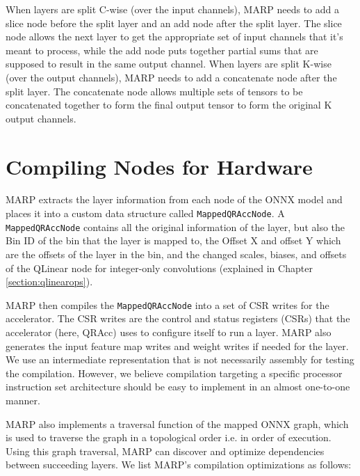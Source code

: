 When layers are split C-wise (over the input channels), MARP needs to add a slice node before the split layer and an add node after the split layer. The slice node allows the next layer to get the appropriate set of input channels that it's meant to process, while the add node puts together partial sums that are supposed to result in the same output channel. When layers are split K-wise (over the output channels), MARP needs to add a concatenate node after the split layer. The concatenate node allows multiple sets of tensors to be concatenated together to form the final output tensor to form the original K output channels. 

\section{Compiling Nodes for Hardware}

MARP extracts the layer information from each node of the ONNX model and places it into a custom data structure called \texttt{MappedQRAccNode}. A \texttt{MappedQRAccNode} contains all the original information of the layer, but also the Bin ID of the bin that the layer is mapped to, the Offset X and offset Y which are the offsets of the layer in the bin, and the changed scales, biases, and offsets of the QLinear node for integer-only convolutions (explained in Chapter \ref{section:qlinearops}).

MARP then compiles the \texttt{MappedQRAccNode} into a set of CSR writes for the accelerator. The CSR writes are the control and status registers (CSRs) that the accelerator (here, QRAcc) uses to configure itself to run a layer. MARP also generates the input feature map writes and weight writes if needed for the layer. We use an intermediate representation that is not necessarily assembly for testing the compilation. However, we believe compilation targeting a specific processor instruction set architecture should be easy to implement in an almost one-to-one manner. 

MARP also implements a traversal function of the mapped ONNX graph, which is used to traverse the graph in a topological order i.e. in order of execution. Using this graph traversal, MARP can discover and optimize dependencies between succeeding layers. We list MARP's compilation optimizations as follows:

